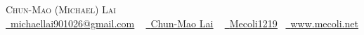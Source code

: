 \documentclass[letterpaper,8pt]{article}
\newcommand{\resumeSubHeadingListStart}{\begin{itemize}[leftmargin=0.0in, label={}]}
\newcommand{\resumeSubHeadingListEnd}{\end{itemize}}
\begin{document}

\begin{center}
    {\huge \scshape Chun-Mao (Michael) Lai} \\ \vspace{3pt}
    \href{mailto:michaellai901026@gmail.com}{\raisebox{-0.1\height}\faEnvelope\  \underline{michaellai901026@gmail.com}} ~ 
    \href{https://www.linkedin.com/in/chun-mao-lai-aa1966229}{\raisebox{-0.1\height}\faLinkedin\ \underline{Chun-Mao Lai}}  ~
    \href{https://github.com/Mecoli1219}{\raisebox{-0.1\height}\faGithub\ \underline{Mecoli1219}}~
    \href{https://www.mecoli.net}{\raisebox{-0.1\height}\faHome\ \underline{www.mecoli.net}}\\
    \vspace{-8pt}
\end{center}

\end{document}
